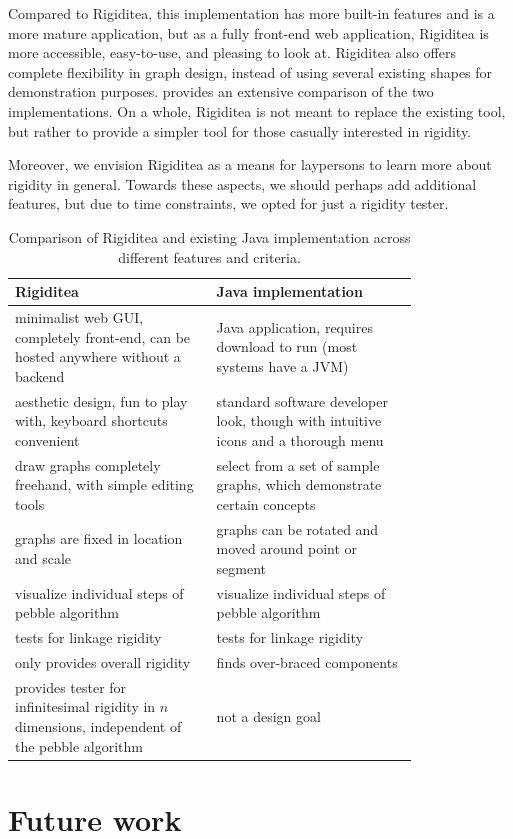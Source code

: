 \documentclass[aps,prd,final,twocolumn,letterpaper,nofootinbib]{revtex4-1}
\begin{document}
Compared to Rigiditea, this implementation
has more built-in features and is a more mature application,
but as a fully front-end web application,
Rigiditea is more accessible, easy-to-use, and pleasing to look at.
Rigiditea also offers complete flexibility in graph design,
instead of using several existing shapes for demonstration purposes.
 provides an extensive comparison of the two implementations.
On a whole, Rigiditea is not meant to replace the existing tool,
but rather to provide a simpler tool for those casually interested
in rigidity.

Moreover, we envision Rigiditea as a means for laypersons
to learn more about rigidity in general.
Towards these aspects, we should perhaps add additional features,
but due to time constraints, we opted for just a rigidity tester.

\begin{table}[ht]
\def\arraystretch{1.5}
\caption{Comparison of Rigiditea and existing Java implementation
across different features and criteria.}
\begin{tabular}{p{0.4\linewidth} | p{0.4\linewidth}}
Rigiditea & Java implementation \\ \hline
minimalist web GUI, completely front-end, can be hosted anywhere
without a backend &
Java application, requires download to run (most systems have a JVM) \\
aesthetic design, fun to play with, keyboard shortcuts convenient &
standard software developer look, though with intuitive icons
and a thorough menu\\
draw graphs completely freehand,
with simple editing tools &
select from a set of sample graphs,
which demonstrate certain concepts \\
graphs are fixed in location and scale &
graphs can be rotated and moved around point or segment \\
visualize individual steps of pebble algorithm &
visualize individual steps of pebble algorithm\\
tests for linkage rigidity & tests for linkage rigidity\\
only provides overall rigidity & finds over-braced components \\
provides tester for infinitesimal rigidity in $n$ dimensions,
independent of the pebble algorithm
& not a design goal
\end{tabular}
\label{tab:comp}
\end{table}

\section{Future work}
\end{document}
